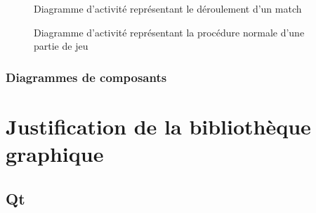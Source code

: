 \documentclass[a4paper]{report}
\begin{document}
\begin{figure}[H]
    \caption{\label{3} Diagramme d'activité représentant le déroulement d'un match}
\end{figure}

\begin{figure}[H]
    \caption{\label{3} Diagramme d'activité représentant la procédure normale d'une partie de jeu}
\end{figure}

\subsection{Diagrammes de composants}







\chapter{Justification de la bibliothèque graphique}
\section{Qt}
\end{document}
